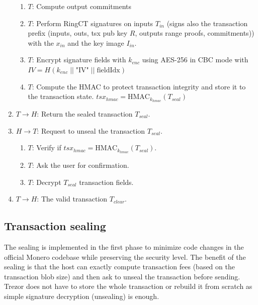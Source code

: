 \documentclass[]{article}
\begin{document}
\begin{enumerate}
\begin{enumerate}
		\item $T$: Compute output commitments
		
		\item $T$: Perform RingCT signatures on inputs $T_{in}$ (signs also the transaction prefix (inputs, outs, tsx pub key $R$, outputs range proofs, commitments)) with the $x_{in}$ and the key image $I_{in}$.
	
		\item $T$: Encrypt signature fields with $k_{enc}$ using AES-256 in CBC mode with $IV = H(k_{enc} \; || \; \text{"IV"} \; || \; \text{fieldIdx})$
		
		\item $T$: Compute the HMAC to protect transaction integrity and store it to the transaction state.
		$tsx_{hmac} = \text{HMAC}_{k_{hmac}}(T_{seal})$
	\end{enumerate} 
	
	\item $T \rightarrow H$: Return the sealed transaction $T_{seal}$.
	
	\item $H \rightarrow T$: Request to unseal the transaction $T_{seal}$.
	\begin{enumerate}
		\item $T$: Verify if $tsx_{hmac} = \text{HMAC}_{k_{hmac}}(T_{seal})$.
		
        \item $T$: Ask the user for confirmation.

		\item $T$: Decrypt $T_{seal}$ transaction fields.
	\end{enumerate}

	\item $T \rightarrow H$: The valid transaction $T_{clear}$.
	
\end{enumerate}


\subsection{Transaction sealing}
The sealing is implemented in the first phase to minimize code changes in the official Monero codebase while preserving the security level. 
The benefit of the sealing is that the host can exactly compute transaction fees (based on the transaction blob size) and then ask to unseal the transaction before sending. Trezor does not have to store the whole transaction or rebuild it from scratch as simple signature decryption (unsealing) is enough.
\end{document}
